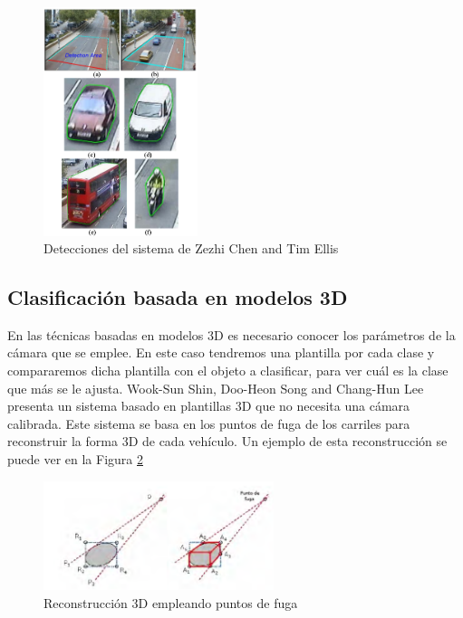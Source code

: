 \begin{figure}[H]
  \begin{center}
    \includegraphics[width=0.4\textwidth]{figures/Estado_arte/svm_iphog.png}
		\caption{Detecciones del sistema de  Zezhi Chen and Tim Ellis~\cite{multi_shape_descriptor}}
		\label{fig.multi_shape_descriptor}
		\end{center}
\end{figure}

\subsection{Clasificación basada en modelos 3D}
En las técnicas basadas en modelos 3D es necesario conocer los parámetros de la cámara que se emplee. En este caso tendremos una plantilla por cada clase y compararemos dicha plantilla con el objeto a clasificar, para ver cuál es la clase que más se le ajusta.
Wook-Sun Shin, Doo-Heon Song and Chang-Hun Lee~\cite{vehicle_classification_by_road} presenta  un  sistema  basado  en  plantillas  3D  que  no necesita una cámara calibrada. Este sistema se basa en los puntos de fuga de los carriles para reconstruir la forma 3D de cada vehículo. Un ejemplo de esta reconstrucción se puede ver en la Figura \ref{fig.3d_fuga}

\begin{figure}[H]
  \begin{center}
    \includegraphics[width=0.6\textwidth]{figures/Estado_arte/3d_puntos_fuga.png}
		\caption{Reconstrucción 3D empleando puntos de fuga}
		\label{fig.3d_fuga}
		\end{center}
\end{figure}

